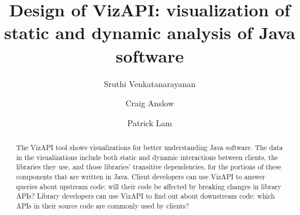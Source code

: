 \documentclass[3p,times]{elsarticle}
\begin{document}
\begin{frontmatter}




  \title{Design of VizAPI: visualization of static and dynamic analysis of Java software}
  

\author[label1]{Sruthi Venkatanarayanan}
\author[label2]{Craig Anslow}
\author[label1]{Patrick Lam}

\address[label1]{University of Waterloo\\200 University Ave W\\Waterloo, ON N2L 3G1\\Canada}
\address[label2]{Victoria University of Wellington\\PO Box 600\\Wellington 6140\\New Zealand}

\begin{abstract}
  The VizAPI tool shows visualizations for better understanding Java software. The data in the visualizations include both static and dynamic interactions between clients, the libraries they use, and those libraries’ transitive dependencies, for the portions of these components that are written in Java. Client developers can use VizAPI to answer queries about upstream code: will their code be affected by breaking changes in library APIs? Library developers can use VizAPI to find out about downstream code: which APIs in their source code are commonly used by clients?


\end{abstract}
\end{frontmatter}
\end{document}
